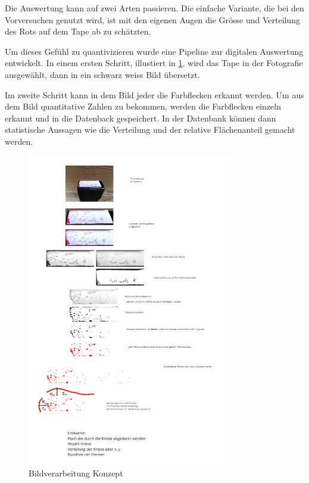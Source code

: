 Die Auswertung kann auf zwei Arten passieren. Die einfache Variante, die bei den Vorversuchen genutzt wird, ist mit den eigenen Augen die Grösse und Verteilung des Rots auf dem Tape ab zu schätzten.

Um dieses Gefühl zu quantivizieren wurde eine Pipeline zur digitalen Auswertung entwickelt. In einem ersten Schritt, illustiert in \ref{fig:Bildverarbeitnugskonzpet}, wird das Tape in der Fotografie ausgewählt, dann in ein schwarz weiss Bild übersetzt.

Im zweite Schritt kann in dem Bild jeder die Farbflecken erkannt werden. Um aus dem Bild quantitative Zahlen zu bekommen, werden die Farbflecken einzeln erkannt und in die Datenback gespeichert. In der Datenbank können dann statistische Aussagen wie die Verteilung und der relative Flächenanteil gemacht werden.

\begin{figure}
    \centering
    \includegraphics[width=0.8\textwidth]{Bilder/Screenshotfrom2024-04-0112-59-42.png}
    \caption{Bildverarbeitung Konzept}
    \label{fig:Bildverarbeitnugskonzpet}
\end{figure}

\newpage
